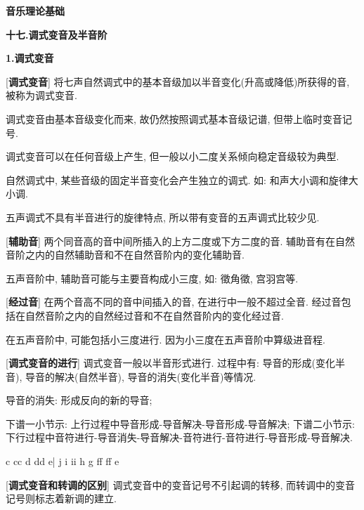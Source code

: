 

\begin{center} 
 \Large \textbf{音乐理论基础}\par
 \textbf{十七.调式变音及半音阶}
\end{center}

\large 
\begin{center}
 \textbf{1.调式变音}\\
\end{center}

[\textbf{调式变音}] 将七声自然调式中的基本音级加以半音变化(升高或降低)所获得的音, 被称为调式变音.\par
\qquad 调式变音由基本音级变化而来, 故仍然按照调式基本音级记谱, 但带上临时变音记号.\par
\qquad 调式变音可以在任何音级上产生, 但一般以小二度关系倾向稳定音级较为典型.\par
\qquad 自然调式中, 某些音级的固定半音变化会产生独立的调式. 如: 和声大小调和旋律大小调.\par
\qquad 五声调式不具有半音进行的旋律特点, 所以带有变音的五声调式比较少见.\par

[\textbf{辅助音}] 两个同音高的音中间所插入的上方二度或下方二度的音. 辅助音有在自然音阶之内的自然辅助音和不在自然音阶内的变化辅助音.\par
\qquad 五声音阶中, 辅助音可能与主要音构成小三度, 如: 徵角徵, 宫羽宫等.\par

[\textbf{经过音}] 在两个音高不同的音中间插入的音, 在进行中一般不超过全音. 经过音包括在自然音阶之内的自然经过音和不在自然音阶内的变化经过音.\par
\qquad 在五声音阶中, 可能包括小三度进行. 因为小三度在五声音阶中算级进音程.\par

[\textbf{调式变音的进行}] 调式变音一般以半音形式进行. 过程中有: 导音的形成(变化半音), 导音的解决(自然半音), 导音的消失(变化半音)等情况.\par
\qquad 导音的消失: 形成反向的新的导音;\par
\qquad 下谱一小节示: 上行过程中导音形成-导音解决-导音形成-导音解决;
\qquad 下谱二小节示: 下行过程中音符进行-导音消失-导音解决-音符进行-音符进行-导音形成-导音解决.\par
\startextract
\Notes \wh c \sh c\wh c \wh d \sh d\wh d \wh e\en\bar
\Notes \wh j \wh i \fl i\wh i \wh h \wh g \sh f\wh f \na f\wh f \wh e\en
\zendextract

[\textbf{调式变音和转调的区别}] 调式变音中的变音记号不引起调的转移, 而转调中的变音记号则标志着新调的建立.\par

